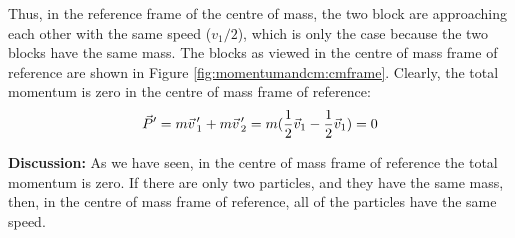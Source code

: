 \begin{example}
Thus, in the reference frame of the centre of mass, the two block are approaching each other with the same speed ($v_1/2$), which is only the case because the two blocks have the same mass. The blocks as viewed in the centre of mass frame of reference are shown in Figure \ref{fig:momentumandcm:cmframe}.
Clearly, the total momentum is zero in the centre of mass frame of reference:
\begin{align*}
\vec P' = m\pvec v'_1+ m\pvec v'_2 = m (\frac{1}{2}\vec v_1 - \frac{1}{2}\vec v_1) = 0
\end{align*}

\textbf{Discussion:} As we have seen, in the centre of mass frame of reference the total momentum is zero. If there are only two particles, and they have the same mass, then, in the centre of mass frame of reference, all of the particles have the same speed. 
\end{example}


